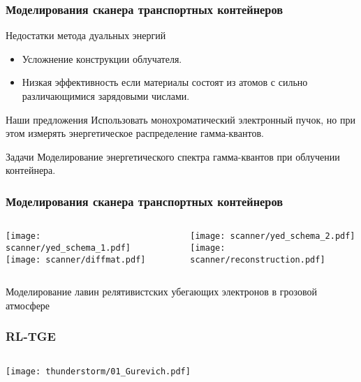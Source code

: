 \begin{frame}
\frametitle{Моделирования сканера транспортных контейнеров}
\begin{block}{Недостатки метода дуальных энергий}%
	\begin{itemize}
		\item Усложнение конструкции облучателя.
		\item Низкая эффективность если материалы состоят из атомов с сильно различающимися зарядовыми числами.
	\end{itemize}
\end{block}
\begin{block}{Наши предложения}%
	Использовать монохроматический электронный пучок, но при этом измерять энергетическое распределение гамма-квантов.
\end{block}
\begin{block}{Задачи}%
	Моделирование энергетического спектра гамма-квантов при облучении контейнера.
\end{block}
\end{frame}

\begin{frame}
\frametitle{Моделирования сканера транспортных контейнеров}
\begin{columns}
    \begin{column}{0.5\textwidth}
        \texttt{[image: scanner/yed\_schema\_1.pdf]}
        \texttt{[image: scanner/diffmat.pdf]}
    \end{column}
    \vline~
    \begin{column}{0.5\textwidth} 
        \texttt{[image: scanner/yed\_schema\_2.pdf]}
        \texttt{[image: scanner/reconstruction.pdf]}
    \end{column}
\end{columns}  
\end{frame}



\begin{frame}
\begin{center}
    \Huge
   Моделирование лавин релятивистских убегающих электронов в грозовой атмосфере
\end{center}
\end{frame}

\begin{frame}
\frametitle{RL-TGE}
\begin{columns}
    \begin{column}{0.5\textwidth}
        \texttt{[image: thunderstorm/01\_Gurevich.pdf]}
    \end{column}
    \vline~
    \begin{column}{0.5\textwidth} 
    \end{column}
\end{columns}  
\end{frame}


